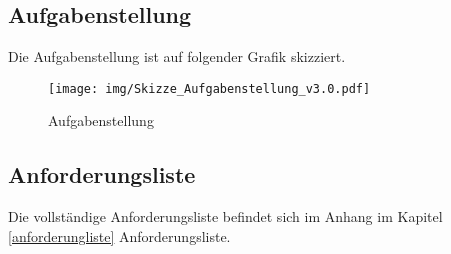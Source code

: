 \subsection{Aufgabenstellung}

Die Aufgabenstellung ist auf folgender Grafik skizziert.

\begin{figure}[H]
\centering
\texttt{[image: img/Skizze\_Aufgabenstellung\_v3.0.pdf]}
\caption{Aufgabenstellung}
\label{fig:aufgebanstellung}
\end{figure}

\subsection{Anforderungsliste}

Die vollständige Anforderungsliste befindet sich im Anhang im Kapitel \ref{anforderungliste} Anforderungsliste.
